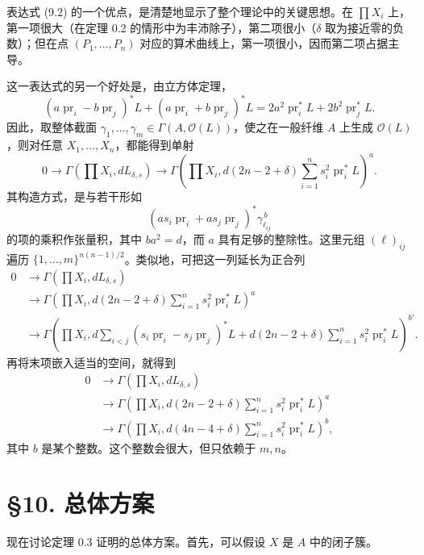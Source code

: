 表达式 (9.2) 的一个优点，是清楚地显示了整个理论中的关键思想。在 $\prod X_i$ 上，第一项很大（在定理 0.2 的情形中为丰沛除子），第二项很小（$\delta$ 取为接近零的负数）；但在点 $(P_1,\ldots,P_n)$ 对应的算术曲线上，第一项很小，因而第二项占据主导。

这一表达式的另一个好处是，由立方体定理，
\[
(a\operatorname{pr}_i-b\operatorname{pr}_j)^*L
+(a\operatorname{pr}_i+b\operatorname{pr}_j)^*L
=2a^2\operatorname{pr}_i^*L+2b^2\operatorname{pr}_j^*L.
\]
因此，取整体截面 $\gamma_1,\ldots,\gamma_m\in\Gamma(A,\mathcal O(L))$，使之在一般纤维 $A$ 上生成 $\mathcal O(L)$，则对任意 $X_1,\ldots,X_n$，都能得到单射
\[
0\longrightarrow\Gamma\left(\prod X_i,dL_{\delta,s}\right)
\longrightarrow
\Gamma\left(\prod X_i,d(2n-2+\delta)\sum_{i=1}^ns_i^2\operatorname{pr}_i^*L\right)^a.
\]
其构造方式，是与若干形如
\[
(as_i\operatorname{pr}_i+as_j\operatorname{pr}_j)^*\gamma_{\ell_{ij}}^{\,b}
\]
的项的乘积作张量积，其中 $ba^2=d$，而 $a$ 具有足够的整除性。这里元组 $(\ell)_{ij}$ 遍历 $\{1,\ldots,m\}^{n(n-1)/2}$。类似地，可把这一列延长为正合列
\begin{equation*}
\begin{aligned}
0&\longrightarrow\Gamma\left(\prod X_i,dL_{\delta,s}\right)\\
&\longrightarrow\Gamma\left(\prod X_i,d(2n-2+\delta)\sum_{i=1}^ns_i^2\operatorname{pr}_i^*L\right)^a\\
&\longrightarrow\Gamma\left(\prod X_i,
 d\sum_{i<j}(s_i\operatorname{pr}_i-s_j\operatorname{pr}_j)^*L
 +d(2n-2+\delta)\sum_{i=1}^ns_i^2\operatorname{pr}_i^*L\right)^{b'}.
\end{aligned}\tag{9.3}
\end{equation*}
再将末项嵌入适当的空间，就得到
\begin{equation*}
\begin{aligned}
0&\longrightarrow\Gamma\left(\prod X_i,dL_{\delta,s}\right)\\
&\longrightarrow\Gamma\left(\prod X_i,d(2n-2+\delta)\sum_{i=1}^ns_i^2\operatorname{pr}_i^*L\right)^a\\
&\longrightarrow\Gamma\left(\prod X_i,d(4n-4+\delta)\sum_{i=1}^ns_i^2\operatorname{pr}_i^*L\right)^b,
\end{aligned}\tag{9.4}
\end{equation*}
其中 $b$ 是某个整数。这个整数会很大，但只依赖于 $m,n$。

\section*{§10. 总体方案}
现在讨论定理 0.3 证明的总体方案。首先，可以假设 $X$ 是 $A$ 中的闭子簇。

